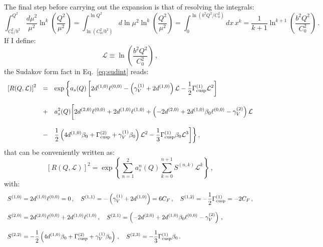 \documentclass[10pt,a4paper]{article}
\begin{document}
The final step before carrying out the expansion is that of resolving
the integrals:
\begin{equation}
\int_{C_0^2/b^2}^{Q^2}\frac{d\mu^2}{\mu^2}\ln^k\left(\frac{Q^2}{\mu^2}\right)
= \int_{\ln(C_0^2/b^2)}^{\ln
  Q^2}d\ln\mu^2\ln^k\left(\frac{Q^2}{\mu^2}\right) = \int^{\ln(b^2Q^2/C_0^2)}_{0}dx\,x^k=\frac{1}{k+1}\ln^{k+1}\left(\frac{b^2Q^2}{C_0^2}\right)\,.
\end{equation}
If I define:
\begin{equation}
\mathcal{L}\equiv \ln\left(\frac{b^2Q^2}{C_0^2}\right)\,,
\end{equation}
the Sudakov form fact in Eq.~\ref{eq:sudint} reads:
\begin{equation}
\begin{array}{rcl}
  \displaystyle \left[R(Q,\mathcal{L})\right]^2&=&\displaystyle \exp\bigg\{a_s(Q)\left[2d^{(1,0)}\ell^{(0,0)}-\left(\gamma_V^{(1)}+2d^{(1,0)}\right)\mathcal{L}-\frac{1}{2}\Gamma_{\rm
                                         cusp}^{(1)}\mathcal{L}^2\right]\\
  \\
                                     &+&\displaystyle a_s^2(Q) \bigg[2d^{(2,0)}\ell^{(0,0)} +
                                         2d^{(1,0)}\ell^{(1,0)}+\left(-2d^{(2,0)}+2d^{(1,0)}\beta_0
                                         \ell^{(0,0)}-\gamma_V^{(2)}\right)\mathcal{L}\\
  \\
                                     &-&\displaystyle \frac12\left(4d^{(1,0)}\beta_0+\Gamma_{\rm
                                         cusp}^{(2)}+\gamma_V^{(1)}\beta_0 \right) \mathcal{L}^2-\frac13\Gamma_{\rm
                                         cusp}^{(1)}\beta_0 \mathcal{L}^3\bigg]\bigg\}\,,
\end{array}
\end{equation}
that can be conveniently written as:
\begin{equation}\label{eq:SudCompact}
  \displaystyle \left[R(Q,\mathcal{L})\right]^2=\exp\left\{\sum_{n=1}^2a_s^n(Q)\sum_{k=0}^{n+1}S^{(n,k)}\mathcal{L}^k\right\}\,,
\end{equation}
with:
\begin{equation}
\begin{array}{l}
\displaystyle S^{(1,0)} =
  2d^{(1,0)}\ell^{(0,0)}=0\,,\quad\displaystyle S^{(1,1)} =
  -\left(\gamma_V^{(1)}+2d^{(1,0)}\right)=6 C_F\,,\quad\displaystyle
                                                   S^{(1,2)} =
  -\frac{1}{2}\Gamma_{\rm cusp}^{(1)}= -2C_F\,,\\
\\
\displaystyle S^{(2,0)} = 2d^{(2,0)}\ell^{(0,0)} +
  2d^{(1,0)}\ell^{(1,0)}\,,\quad\displaystyle S^{(2,1)} =
                           \left(-2d^{(2,0)}+2d^{(1,0)}\beta_0
  \ell^{(0,0)}-\gamma_V^{(2)}\right)\,,\\
\\
\displaystyle S^{(2,2)} = -\frac12\left(4d^{(1,0)}\beta_0+\Gamma_{\rm cusp}^{(2)}+\gamma_V^{(1)}\beta_0 \right)\,,\quad\displaystyle S^{(2,3)} = -\frac13\Gamma_{\rm cusp}^{(1)}\beta_0\,.
\end{array}
\end{equation}
\end{document}
